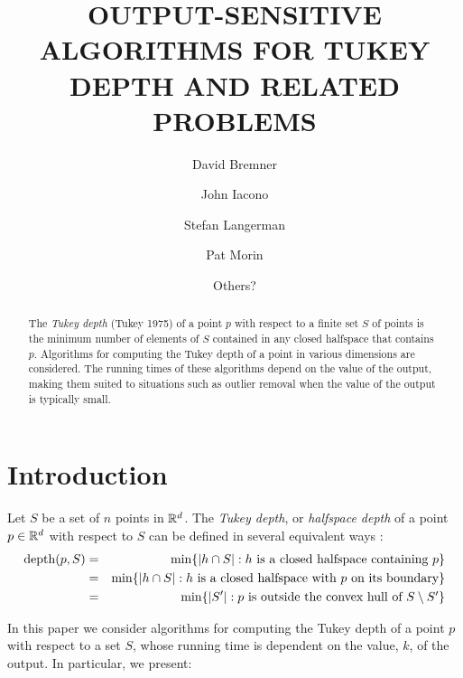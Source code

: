 \documentclass[charterfonts,lotsofwhite]{patmorin}
\title{\MakeUppercase{Output-Sensitive Algorithms for Tukey Depth and
        Related Problems}}
\author{David Bremner \and
	John Iacono \and
	Stefan Langerman \and
	Pat Morin \and
	Others?}
\date{}
\newcommand{\td}{\mathrm{depth}}
\begin{document}
\maketitle

\begin{abstract}
The \emph{Tukey depth} (Tukey 1975) of a point $p$ with respect to a
finite set $S$ of points is the minimum number of elements of $S$
contained in any closed halfspace that contains $p$.  Algorithms for
computing the Tukey depth of a point in various dimensions are
considered.  The running times of these algorithms depend on the value
of the output, making them suited to situations such as outlier
removal when the value of the output is typically small.
\end{abstract}

\section{Introduction}

Let $S$ be a set of $n$ points in $\mathbb{R}^d$.
The \emph{Tukey depth}, or \emph{halfspace depth} of a point $p\in\mathbb{R}^d$ with
respect to $S$ can be defined in several equivalent ways \cite{t75}:
\begin{eqnarray}
\td(p,S) & = & \min\{ |h\cap S| :
	             \mbox{$h$ is a closed halfspace containing $p$} \} \\ 
                     \eqlabel{tuk-orig}
            & = & \min\{ |h\cap S| :
                      \mbox{$h$ is a closed halfspace with $p$ on its boundary} \} \\ 
                       \eqlabel{tuk-boundary}
            & = & \min\{ |S'| :
                      \mbox{$p$ is outside the convex hull of 
                           $S\setminus S'$} \}
                      \eqlabel{tuk-hull}
\end{eqnarray}

In this paper we consider algorithms for computing the Tukey depth of
a point $p$ with respect to a set $S$, whose running time is dependent
on the value, $k$, of the output. In particular, we present:
\end{document}
